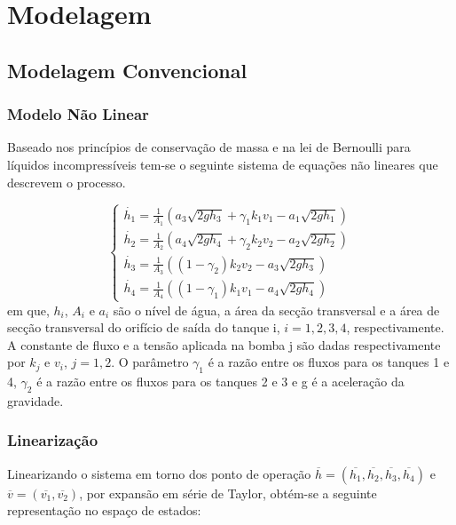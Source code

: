 %

\chapter{Modelagem}

\section{Modelagem Convencional} \label{secModConvencional}
\subsection{Modelo Não Linear}
Baseado nos princípios de conservação de massa e na lei de Bernoulli para líquidos incompressíveis tem-se o seguinte sistema de equações não lineares que descrevem o processo.

\begin{equation}
	\begin{cases}
		\dot{h_{1}} = \frac{1}{A_{1}}(a_{3}\sqrt{2gh_{3}} + \gamma_{1}k_{1}v_{1} - a_{1}\sqrt{2gh_{1}})\\
		
		\dot{h_{2}} = \frac{1}{A_{2}}(a_{4}\sqrt{2gh_{4}} + \gamma_{2}k_{2}v_{2} - a_{2}\sqrt{2gh_{2}})\\
		
		\dot{h_{3}} = \frac{1}{A_{3}}((1 - \gamma_{2})k_{2}v_{2} - a_{3}\sqrt{2gh_{3}})\\
		
		\dot{h_{4}} = \frac{1}{A_{4}}((1 - \gamma_{1})k_{1}v_{1} - a_{4}\sqrt{2gh_{4}})
	\end{cases}
\end{equation}
em que, $h_{i}$, $A_{i}$ e $a_{i}$ são o nível de água, a área da secção transversal e a área de secção transversal do orifício de saída do tanque i, $i=1,2,3,4$, respectivamente. A constante de fluxo e a tensão aplicada na bomba j são dadas respectivamente por $k_{j}$ e $v_{i}$, $j=1,2$. O parâmetro $\gamma_{1}$ é a razão entre os fluxos para os tanques 1 e 4, $\gamma_{2}$ é a razão entre os fluxos para os tanques 2 e 3 e g é a aceleração da gravidade. 

\subsection{Linearização}
Linearizando o sistema em torno dos ponto de operação $\overline{h}=(\overline{h_{1}},\overline{h_{2}},\overline{h_{3}},\overline{h_{4}})$ e $\overline{v}=(\overline{v_{1}},\overline{v_{2}})$, por expansão em série de Taylor, obtém-se a seguinte representação no espaço de estados:

